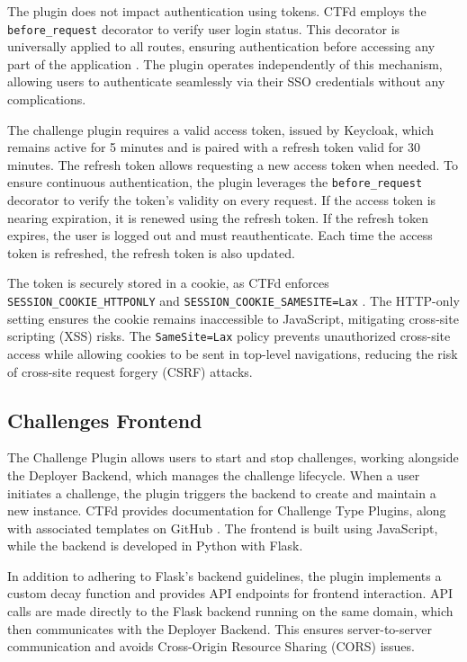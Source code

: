 The plugin does not impact authentication using tokens. CTFd employs the \texttt{before\_\allowbreak request} decorator to verify user login status. This decorator is universally applied to all routes, ensuring authentication before accessing any part of the application \cite{CTFdInitialization}. The plugin operates independently of this mechanism, allowing users to authenticate seamlessly via their SSO credentials without any complications.

The challenge plugin requires a valid access token, issued by Keycloak, which remains active for 5 minutes and is paired with a refresh token valid for 30 minutes. The refresh token allows requesting a new access token when needed. To ensure continuous authentication, the plugin leverages the \texttt{before\_\allowbreak request} decorator to verify the token's validity on every request. If the access token is nearing expiration, it is renewed using the refresh token. If the refresh token expires, the user is logged out and must reauthenticate. Each time the access token is refreshed, the refresh token is also updated.

The token is securely stored in a cookie, as CTFd enforces \texttt{SESSION\_COOKIE\_\allowbreak HTTPONLY} and \texttt{SESSION\_COOKIE\_SAMESITE=Lax} \cite{CTFdConfig}. The HTTP-only setting ensures the cookie remains inaccessible to JavaScript, mitigating cross-site scripting (XSS) risks. The \texttt{SameSite=Lax} policy prevents unauthorized cross-site access while allowing cookies to be sent in top-level navigations, reducing the risk of cross-site request forgery (CSRF) attacks.

\subsection{Challenges Frontend}
The Challenge Plugin allows users to start and stop challenges, working alongside the Deployer Backend, which manages the challenge lifecycle. When a user initiates a challenge, the plugin triggers the backend to create and maintain a new instance. CTFd provides documentation for Challenge Type Plugins, along with associated templates on GitHub \parencite{CTFdChallengeTypes}. The frontend is built using JavaScript, while the backend is developed in Python with Flask.

In addition to adhering to Flask's backend guidelines, the plugin implements a custom decay function and provides API endpoints for frontend interaction. API calls are made directly to the Flask backend running on the same domain, which then communicates with the Deployer Backend. This ensures server-to-server communication and avoids Cross-Origin Resource Sharing (CORS) issues.

